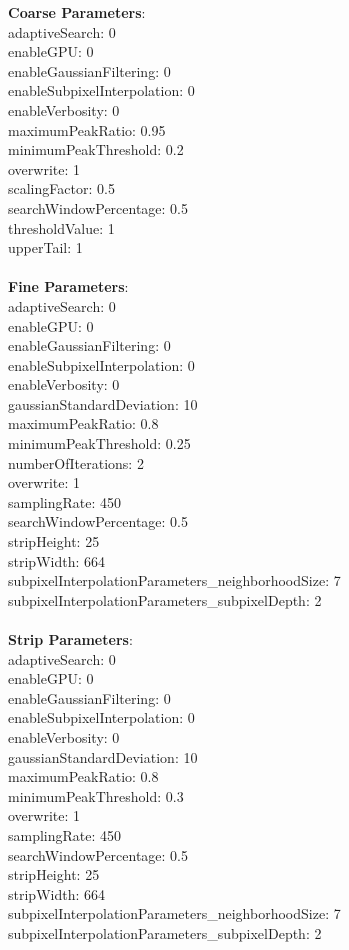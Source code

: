 \documentclass[11pt]{article}
\begin{document}
\textbf{Coarse Parameters}: \\
adaptiveSearch: 0\\
enableGPU: 0\\
enableGaussianFiltering: 0\\
enableSubpixelInterpolation: 0\\
enableVerbosity: 0\\
maximumPeakRatio: 0.95\\
minimumPeakThreshold: 0.2\\
overwrite: 1\\
scalingFactor: 0.5\\
searchWindowPercentage: 0.5\\
thresholdValue: 1\\
upperTail: 1\\
\\
\textbf{Fine Parameters}: \\
adaptiveSearch: 0\\
enableGPU: 0\\
enableGaussianFiltering: 0\\
enableSubpixelInterpolation: 0\\
enableVerbosity: 0\\
gaussianStandardDeviation: 10\\
maximumPeakRatio: 0.8\\
minimumPeakThreshold: 0.25\\
numberOfIterations: 2\\
overwrite: 1\\
samplingRate: 450\\
searchWindowPercentage: 0.5\\
stripHeight: 25\\
stripWidth: 664\\
subpixelInterpolationParameters\_neighborhoodSize: 7\\
subpixelInterpolationParameters\_subpixelDepth: 2\\
\\
\textbf{Strip Parameters}: \\
adaptiveSearch: 0\\
enableGPU: 0\\
enableGaussianFiltering: 0\\
enableSubpixelInterpolation: 0\\
enableVerbosity: 0\\
gaussianStandardDeviation: 10\\
maximumPeakRatio: 0.8\\
minimumPeakThreshold: 0.3\\
overwrite: 1\\
samplingRate: 450\\
searchWindowPercentage: 0.5\\
stripHeight: 25\\
stripWidth: 664\\
subpixelInterpolationParameters\_neighborhoodSize: 7\\
subpixelInterpolationParameters\_subpixelDepth: 2\\
\\
\newpage
\end{document}
